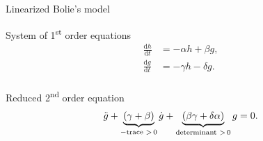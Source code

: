 \documentclass{beamer}
\providecommand{\m}[1]{\ensuremath{\mathrm{#1}}}
\begin{document}
\begin{frame}{Linearized Bolie's model}

System of 1\textsuperscript{st} order equations
\begin{equation*}
\begin{aligned}
\frac{\m{d}h}{\m{d}t}&=-\alpha h + \beta g,\\
\frac{\m{d}g}{\m{d}t}&=-\gamma h - \delta g.\\
\end{aligned}
\end{equation*}

Reduced 2\textsuperscript{nd} order equation
\begin{equation*}
	\ddot g+\underbrace{%
	(\gamma+\beta)}%
	_{- \text{trace }> \,0}%
	\dot g+\underbrace{%
	(\beta \gamma+\delta \alpha)}%
	_{\text{determinant }> \,0}g=0.
\end{equation*}

%

\end{frame}

%
%
%
%
%
\end{document}
